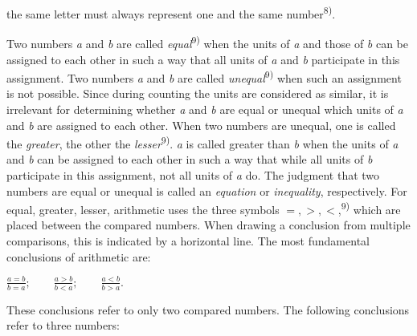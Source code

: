 \thispagestyle{fancy}

\vspace{0.5cm}

the same letter must always represent one and the same number\textsuperscript{8)}.

Two numbers \textit{a} and \textit{b} are called \textit{equal}\textsuperscript{9)} when the units of \textit{a} and those of \textit{b} can be assigned to each other in such a way that all units of \textit{a} and \textit{b} participate in this assignment. Two numbers \textit{a} and \textit{b} are called \textit{unequal}\textsuperscript{9)} when such an assignment is not possible. Since during counting the units are considered as similar, it is irrelevant for determining whether \textit{a} and \textit{b} are equal or unequal which units of \textit{a} and \textit{b} are assigned to each other. When two numbers are unequal, one is called the \textit{greater}, the other the \textit{lesser}\textsuperscript{9)}. \textit{a} is called greater than \textit{b} when the units of \textit{a} and \textit{b} can be assigned to each other in such a way that while all units of \textit{b} participate in this assignment, not all units of \textit{a} do. The judgment that two numbers are equal or unequal is called an \textit{equation} or \textit{inequality}, respectively. For equal, greater, lesser, arithmetic uses the three symbols $=, >, <$,\textsuperscript{9)} which are placed between the compared numbers. When drawing a conclusion from multiple comparisons, this is indicated by a horizontal line. The most fundamental conclusions of arithmetic are:

\begin{center}
$\displaystyle \frac{a = b}{b = a}; \qquad \frac{a > b}{b < a}; \qquad \frac{a < b}{b > a}.$
\end{center}

These conclusions refer to only two compared numbers. The following conclusions refer to three numbers:


